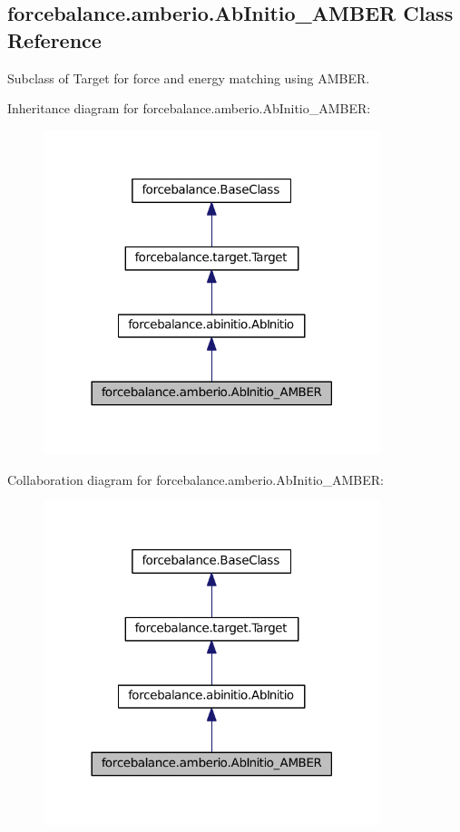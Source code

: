 \hypertarget{classforcebalance_1_1amberio_1_1AbInitio__AMBER}{\subsection{forcebalance.\-amberio.\-Ab\-Initio\-\_\-\-A\-M\-B\-E\-R \-Class \-Reference}
\label{classforcebalance_1_1amberio_1_1AbInitio__AMBER}
}


\-Subclass of \-Target for force and energy matching using \-A\-M\-B\-E\-R.  




\-Inheritance diagram for forcebalance.\-amberio.\-Ab\-Initio\-\_\-\-A\-M\-B\-E\-R\-:
\nopagebreak
\begin{figure}[H]
\begin{center}
\leavevmode
\includegraphics[width=278pt]{classforcebalance_1_1amberio_1_1AbInitio__AMBER__inherit__graph}
\end{center}
\end{figure}


\-Collaboration diagram for forcebalance.\-amberio.\-Ab\-Initio\-\_\-\-A\-M\-B\-E\-R\-:
\nopagebreak
\begin{figure}[H]
\begin{center}
\leavevmode
\includegraphics[width=278pt]{classforcebalance_1_1amberio_1_1AbInitio__AMBER__coll__graph}
\end{center}
\end{figure}
